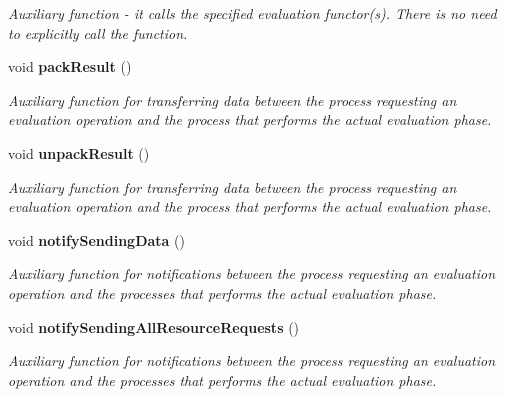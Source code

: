 \begin{CompactItemize}
\begin{CompactList}\small\item\em Auxiliary function - it calls the specified evaluation functor(s). There is no need to explicitly call the function. \item\end{CompactList}\item 
void {\bf pack\-Result} ()
\begin{CompactList}\small\item\em Auxiliary function for transferring data between the process requesting an evaluation operation and the process that performs the actual evaluation phase. \item\end{CompactList}\item 
void {\bf unpack\-Result} ()
\begin{CompactList}\small\item\em Auxiliary function for transferring data between the process requesting an evaluation operation and the process that performs the actual evaluation phase. \item\end{CompactList}\item 
void {\bf notify\-Sending\-Data} ()
\begin{CompactList}\small\item\em Auxiliary function for notifications between the process requesting an evaluation operation and the processes that performs the actual evaluation phase. \item\end{CompactList}\item 
void {\bf notify\-Sending\-All\-Resource\-Requests} ()
\begin{CompactList}\small\item\em Auxiliary function for notifications between the process requesting an evaluation operation and the processes that performs the actual evaluation phase. \item\end{CompactList}\end{CompactItemize}
